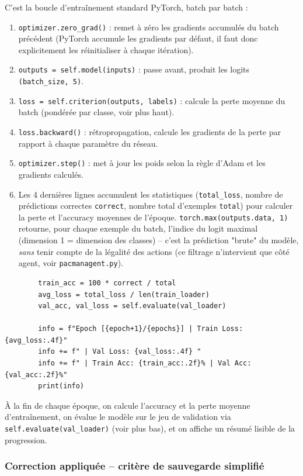 \documentclass[a4paper,12pt]{article}
\begin{document}
C'est la boucle d'entraînement standard PyTorch, batch par batch :
\begin{enumerate}
    \item \texttt{optimizer.zero\_grad()} : remet à zéro les gradients
    accumulés du batch précédent (PyTorch accumule les gradients par
    défaut, il faut donc explicitement les réinitialiser à chaque
    itération).
    \item \texttt{outputs = self.model(inputs)} : passe avant, produit
    les logits \texttt{(batch\_size, 5)}.
    \item \texttt{loss = self.criterion(outputs, labels)} : calcule la
    perte moyenne du batch (pondérée par classe, voir plus haut).
    \item \texttt{loss.backward()} : rétropropagation, calcule les
    gradients de la perte par rapport à chaque paramètre du réseau.
    \item \texttt{optimizer.step()} : met à jour les poids selon la
    règle d'Adam et les gradients calculés.
    \item Les 4 dernières lignes accumulent les statistiques
    (\texttt{total\_loss}, nombre de prédictions correctes
    \texttt{correct}, nombre total d'exemples \texttt{total}) pour
    calculer la perte et l'accuracy moyennes de l'époque.
    \texttt{torch.max(outputs.data, 1)} retourne, pour chaque exemple du
    batch, l'indice du logit maximal (dimension 1 = dimension des
    classes) -- c'est la prédiction "brute" du modèle, \emph{sans} tenir
    compte de la légalité des actions (ce filtrage n'intervient que côté
    agent, voir \texttt{pacmanagent.py}).
\end{enumerate}

\begin{lstlisting}
        train_acc = 100 * correct / total
        avg_loss = total_loss / len(train_loader)
        val_acc, val_loss = self.evaluate(val_loader)

        info = f"Epoch [{epoch+1}/{epochs}] | Train Loss: {avg_loss:.4f}"
        info += f" | Val Loss: {val_loss:.4f} "
        info += f" | Train Acc: {train_acc:.2f}% | Val Acc: {val_acc:.2f}%"
        print(info)
\end{lstlisting}

À la fin de chaque époque, on calcule l'accuracy et la perte moyenne
d'entraînement, on évalue le modèle sur le jeu de validation via
\texttt{self.evaluate(val\_loader)} (voir plus bas), et on affiche un
résumé lisible de la progression.

\subsubsection{Correction appliquée -- critère de sauvegarde simplifié}
\label{sec:artifice-save}
\end{document}

